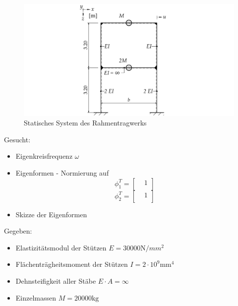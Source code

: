 \documentclass[
  letterpaper,
  DIV=11]{scrreprt}
\providecommand{\tightlist}{%
  \setlength{\itemsep}{0pt}\setlength{\parskip}{0pt}}\usepackage{longtable,booktabs,array}
\begin{document}
\begin{figure}[H]

{\centering \includegraphics{index_files/mediabag/bilder/aufgabe_mms_steif_system.pdf}

}

\caption{\label{fig-mms_steif_system_mms2}Statisches System des
Rahmentragwerks}

\end{figure}

Gesucht:

\begin{itemize}
\item
  Eigenkreisfrequenz \(\omega\)
\item
  Eigenformen - Normierung auf \[\phi_1^T = 
  \begin{bmatrix}
   &  1\\
  \end{bmatrix} \] \[\phi_2^T =
  \begin{bmatrix}
   &  1\\
  \end{bmatrix}\]
\item
  Skizze der Eigenformen
\end{itemize}

Gegeben:

\begin{itemize}
\tightlist
\item
  Elastizitätsmodul der Stützen \(E = 30000 \text{N}/{mm}^2\)
\item
  Flächenträgheitsmoment der Stützen \(I = 2 \cdot 10^9 \text{mm}^4\)
\item
  Dehnsteifigkeit aller Stäbe \(E\cdot A = \infty\)
\item
  Einzelmassen \(M = 20000 \text{kg}\)
\end{itemize}

\newpage{}
\end{document}
